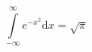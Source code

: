 \documentclass[14pt]{article}
\begin{document}
\pagestyle{empty}
\[ \int\limits_{-\infty}^{\infty} e^{-x^2} \mathrm dx = \sqrt{\pi} \]
\end{document}
